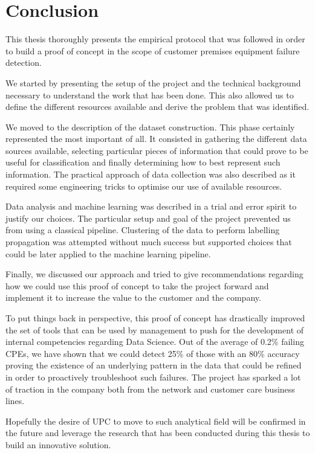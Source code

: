 \chapter{Conclusion}
This thesis thoroughly presents the empirical protocol that was followed in order to build a proof of concept in the scope of customer premises equipment failure detection.

We started by presenting the setup of the project and the technical background necessary to understand the work that has been done. This also allowed us to define the different resources available and derive the problem that was identified.

We moved to the description of the dataset construction. This phase certainly represented the most important of all. It consisted in gathering the different data sources available, selecting particular pieces of information that could prove to be useful for classification and finally determining how to best represent such information. The practical approach of data collection was also described as it required some engineering tricks to optimise our use of available resources.

Data analysis and machine learning was described in a trial and error spirit to justify our choices. The particular setup and goal of the project prevented us from using a classical pipeline. Clustering of the data to perform labelling propagation was attempted without much success but supported choices that could be later applied to the machine learning pipeline. 

Finally, we discussed our approach and tried to give recommendations regarding how we could use this proof of concept to take the project forward and implement it to increase the value to the customer and the company. 

To put things back in perspective, this proof of concept has drastically improved the set of tools that can be used by management to push for the development of internal competencies regarding Data Science. Out of the average of 0.2\% failing CPEs, we have shown that we could detect 25\% of those with an 80\% accuracy proving the existence of an underlying pattern in the data that could be refined in order to proactively troubleshoot such failures. The project has sparked a lot of traction in the company both from the network and customer care business lines. 

Hopefully the desire of UPC to move to such analytical field will be confirmed in the future and leverage the research that has been conducted during this thesis to build an innovative solution.